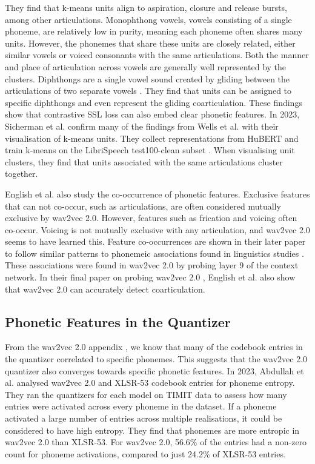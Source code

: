 They find that k-means units align to aspiration, closure and release bursts, among other articulations. Monophthong vowels, vowels consisting of a single phoneme, are relatively low in purity, meaning each phoneme often shares many units. However, the phonemes that share these units are closely related, either similar vowels or voiced consonants with the same articulations. Both the manner and place of articulation across vowels are generally well represented by the clusters. Diphthongs are a single vowel sound created by gliding between the articulations of two separate vowels \cite{ipahandbook_1999}. They find that units can be assigned to specific diphthongs and even represent the gliding coarticulation. These findings show that contrastive SSL loss can also embed clear phonetic features. In 2023, Sicherman et al. \cite{sicherman2023analysingdiscrete} confirm many of the findings from Wells et al. \cite{wells2022phonetic} with their visualisation of k-means units. They collect representations from HuBERT \cite{hsu2021hubert} and train k-means on the LibriSpeech test100-clean subset \cite{librispeech}. When visualising unit clusters, they find that units associated with the same articulations cluster together. 

English et al. \cite{english2023discovering} also study the co-occurrence of phonetic features. Exclusive features that can not co-occur, such as articulations, are often considered mutually exclusive by wav2vec 2.0. However, features such as frication and voicing often co-occur. Voicing is not mutually exclusive with any articulation, and wav2vec 2.0 seems to have learned this. Feature co-occurrences are shown in their later paper \cite{english2024searching} to follow similar patterns to phonemeic associations found in linguistics studies \cite{sagey1986representation}. These associations were found in wav2vec 2.0 by probing layer 9 of the context network. In their final paper on probing wav2vec 2.0 \cite{wav2vec}, English et al. \cite{english2024following} also show that wav2vec 2.0 can accurately detect coarticulation. 

\subsection{Phonetic Features in the Quantizer}\label{lr_subsec:analysis_quantizer}
From the wav2vec 2.0 appendix \cite{wav2vec}, we know that many of the codebook entries in the quantizer correlated to specific phonemes. This suggests that the wav2vec 2.0 quantizer also converges towards specific phonetic features. In 2023, Abdullah et al. \cite{abdullah2023information} analysed wav2vec 2.0 and XLSR-53 codebook entries for phoneme entropy. They ran the quantizers for each model on TIMIT data \cite{timit} to assess how many entries were activated across every phoneme in the dataset. If a phoneme activated a large number of entries across multiple realisations, it could be considered to have high entropy. They find that phonemes are more entropic in wav2vec 2.0 than XLSR-53. For wav2vec 2.0, 56.6\% of the entries had a non-zero count for phoneme activations, compared to just 24.2\% of XLSR-53 entries. 

